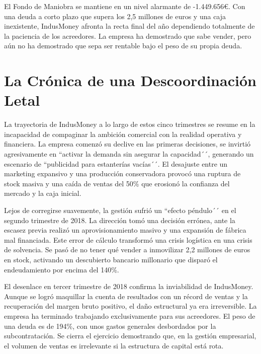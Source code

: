 El Fondo de Maniobra se mantiene en un nivel alarmante de -1.449.656€. Con una deuda a corto plazo que supera los 2,5 millones de euros y una caja inexistente, IndusMoney afronta la recta final del año dependiendo totalmente de la paciencia de los acreedores. La empresa ha demostrado que sabe vender, pero aún no ha demostrado que sepa ser rentable bajo el peso de su propia deuda.

\section*{La Crónica de una Descoordinación Letal}
La trayectoria de IndusMoney a lo largo de estos cinco trimestres se resume en la incapacidad de compaginar la ambición comercial con la realidad operativa y financiera. La empresa comenzó su declive en las primeras decisiones, se invirtió agresivamente en ``activar la demanda sin asegurar la capacidad´´, generando un escenario de ``publicidad para estanterías vacías´´. El desajuste entre un marketing expansivo y una producción conservadora provocó una ruptura de stock masiva y una caída de ventas del 50\% que erosionó la confianza del mercado y la caja inicial.

Lejos de corregirse suavemente, la gestión sufrió un ``efecto péndulo´´ en el segundo trimestre de 2018. La dirección tomó una decisión errónea, ante la escasez previa realizó un aprovisionamiento masivo y una expansión de fábrica mal financiada. Este error de cálculo transformó una crisis logística en una crisis de solvencia. Se pasó de no tener qué vender a inmovilizar 2,2 millones de euros en stock, activando un descubierto bancario millonario que disparó el endeudamiento por encima del 140\%.

El desenlace en tercer trimestre de 2018 confirma la inviabilidad de IndusMoney. Aunque se logró maquillar la cuenta de resultados con un récord de ventas y la recuperación del margen bruto positivo, el daño estructural ya era irreversible. La empresa ha terminado trabajando exclusivamente para sus acreedores. El peso de una deuda es de 194\%, con unos gastos generales desbordados por la subcontratación. Se cierra el ejercicio demostrando que, en la gestión empresarial, el volumen de ventas es irrelevante si la estructura de capital está rota.

